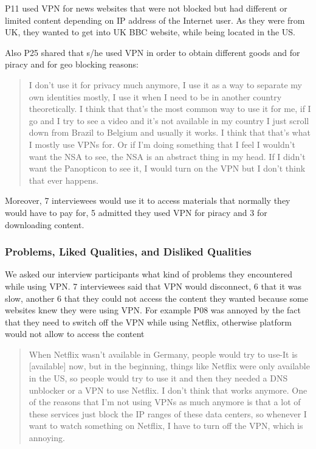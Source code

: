 P11 used VPN for news websites that were not blocked but had different or
limited content depending on IP address of the Internet user. As they were
from UK, they wanted to get into UK BBC website, while being located in the
US.

Also P25 shared that s/he used VPN in order to obtain different goods and for
piracy and for geo blocking reasons: \begin{quote}I don't use it for privacy
much anymore, I use it as a way to separate my own identities mostly, I use it
when I need to be in another country theoretically. I think that that's the
most common way to use it for me, if I go and I try to see a video and it's
not available in my country I just scroll down from Brazil to Belgium and
usually it works. I think that that's what I mostly use VPNs for. Or if I'm
doing something that I feel I wouldn't want  the NSA to see,  the NSA  is an abstract
thing in my head. If I didn't want the Panopticon to see it, I would turn on
the VPN but I don't think that ever happens.\end{quote}

Moreover, 7 interviewees would use it to access materials that normally they
would have to pay for, 5 admitted they used VPN for piracy and 3 for
downloading content.









\subsubsection{Problems, Liked Qualities, and Disliked Qualities}
We asked our
interview participants what kind of problems they encountered while using VPN.
7 interviewees said that VPN would disconnect, 6
that it was slow, another 6 that they could not access the content they wanted
because some websites knew they were using VPN. For example P08 was annoyed by the fact that they need to switch off the VPN
while using Netflix, otherwise platform would not allow to access the content

\begin{quote}When Netflix wasn't available in Germany, people would try to use-It is [available] now, but in the beginning, things like Netflix were
only available in the US, so people would try to use it and then they needed a
DNS unblocker or a VPN to use Netflix. I don't think that works anymore. One
of the reasons that I'm not using VPNs as much anymore is that a lot of these
services just block the IP ranges of these data centers, so whenever I want to
watch something on Netflix, I have to turn off the VPN, which is annoying.
\end{quote}

